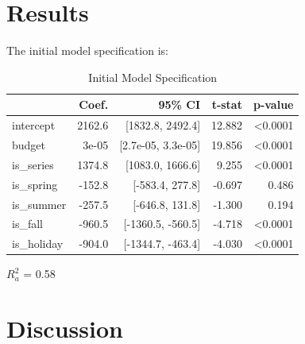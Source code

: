 \documentclass[10pt]{article}
\begin{document}
\section{Results}

The initial model specification is:

\begin{table}[H]
  \begin{threeparttable}
    \caption{Initial Model Specification}
       \begin{tabular}{l r r r r} 
	 \toprule
	 & Coef. & 95\% CI & t-stat & p-value \\ [0.5ex] 
	 \midrule
	intercept & 2162.6 & [1832.8, 2492.4] & 12.882 & <0.0001 \\ 
	budget & 3e-05 & [2.7e-05, 3.3e-05] & 19.856 & <0.0001\\
	is\_series & 1374.8 & [1083.0, 1666.6] & 9.255 & <0.0001\\
	is\_spring & -152.8 & [-583.4, 277.8] & -0.697 & 0.486\\
	is\_summer & -257.5 & [-646.8, 131.8] & -1.300 & 0.194\\
	is\_fall & -960.5 & [-1360.5, -560.5] & -4.718 & <0.0001\\
	is\_holiday & -904.0 & [-1344.7, -463.4] & -4.030 & <0.0001\\[1ex]
	\bottomrule
      \end{tabular}
    \begin{tablenotes}
      \small
      \item $R^2_a$ = 0.58
    \end{tablenotes}  
  \end{threeparttable}    
\end{table}

\section{Discussion}


 
%
\appendix
\end{document}
